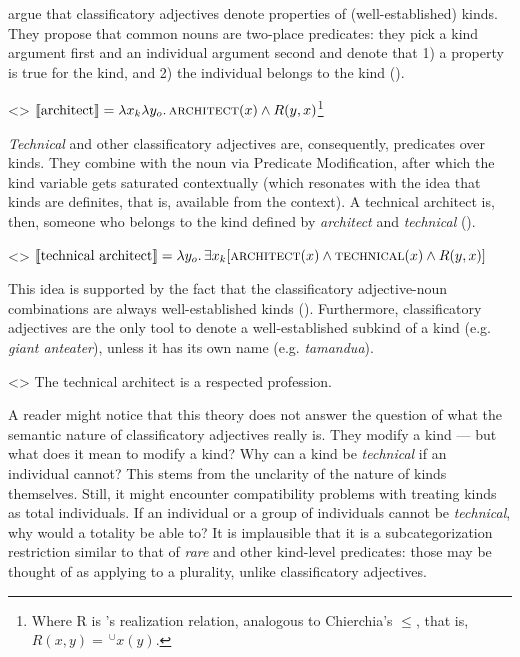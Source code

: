 \documentclass[a4paper, 12pt]{article}
\begin{document}
\textcite{mcnally2004relationaladjectivesproperties} argue that classificatory adjectives denote properties of (well-established) kinds. They propose that common nouns are two-place predicates: they pick a kind argument first and an individual argument second and denote that 1) a property is true for the kind, and 2) the individual belongs to the kind (\nextx).

\ex<>
    $\llbracket \text{architect} \rrbracket = \lambda x_k\lambda y_o.\,\textsc{architect}(x) \land R(y,x)$\footnote{Where R is \textcite{carlson1977referencekindsenglish}'s realization relation, analogous to Chierchia's $\le$, that is, $R(x,y) = \,^\cup x(y)$.}
\xe

\textit{Technical} and other classificatory adjectives are, consequently, predicates over kinds. They combine with the noun via Predicate Modification, after which the kind variable gets saturated contextually (which resonates with the idea that kinds are definites, that is, available from the context). A technical architect is, then, someone who belongs to the kind defined by \textit{architect} and \textit{technical} (\nextx).

\ex<>
    $\llbracket \text{technical architect} \rrbracket = \lambda y_o.\,\exists x_k[\textsc{architect}(x)\land\textsc{technical}(x)\land R(y,x)]$
\xe

This idea is supported by the fact that the classificatory adjective-noun combinations are always well-established kinds (\nextx). Furthermore, classificatory adjectives are the only tool to denote a well-established subkind of a kind (e.g. \textit{\emph{giant} anteater}), unless it has its own name (e.g. \textit{tamandua}).

\ex<>
    The technical architect is a respected profession.
\xe

A reader might notice that this theory does not answer the question of what the semantic nature of classificatory adjectives really is. They modify a kind --- but what does it mean to modify a kind? Why can a kind be \textit{technical} if an individual cannot? This stems from the unclarity of the nature of kinds themselves. Still, it might encounter compatibility problems with treating kinds as total individuals. If an individual or a group of individuals cannot be \textit{technical}, why would a totality be able to? It is implausible that it is a subcategorization restriction similar to that of \textit{rare} and other kind-level predicates: those may be thought of as applying to a plurality, unlike classificatory adjectives.
\end{document}
